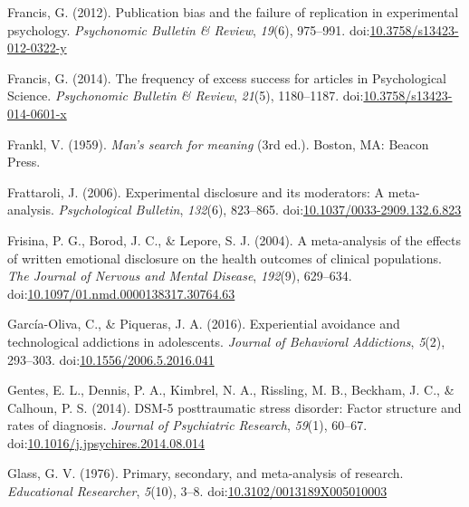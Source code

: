 \documentclass[,man]{apa6}
\begin{document}
\leavevmode\hypertarget{ref-Francis2012}{}%
Francis, G. (2012). Publication bias and the failure of replication in experimental psychology. \emph{Psychonomic Bulletin \& Review}, \emph{19}(6), 975--991. doi:\href{https://doi.org/10.3758/s13423-012-0322-y}{10.3758/s13423-012-0322-y}

\leavevmode\hypertarget{ref-Francis2014}{}%
Francis, G. (2014). The frequency of excess success for articles in Psychological Science. \emph{Psychonomic Bulletin \& Review}, \emph{21}(5), 1180--1187. doi:\href{https://doi.org/10.3758/s13423-014-0601-x}{10.3758/s13423-014-0601-x}

\leavevmode\hypertarget{ref-Frankl1959}{}%
Frankl, V. (1959). \emph{Man's search for meaning} (3rd ed.). Boston, MA: Beacon Press.

\leavevmode\hypertarget{ref-Frattaroli2006}{}%
Frattaroli, J. (2006). Experimental disclosure and its moderators: A meta-analysis. \emph{Psychological Bulletin}, \emph{132}(6), 823--865. doi:\href{https://doi.org/10.1037/0033-2909.132.6.823}{10.1037/0033-2909.132.6.823}

\leavevmode\hypertarget{ref-Frisina2004a}{}%
Frisina, P. G., Borod, J. C., \& Lepore, S. J. (2004). A meta-analysis of the effects of written emotional disclosure on the health outcomes of clinical populations. \emph{The Journal of Nervous and Mental Disease}, \emph{192}(9), 629--634. doi:\href{https://doi.org/10.1097/01.nmd.0000138317.30764.63}{10.1097/01.nmd.0000138317.30764.63}

\leavevmode\hypertarget{ref-Garcia-Oliva2016}{}%
García-Oliva, C., \& Piqueras, J. A. (2016). Experiential avoidance and technological addictions in adolescents. \emph{Journal of Behavioral Addictions}, \emph{5}(2), 293--303. doi:\href{https://doi.org/10.1556/2006.5.2016.041}{10.1556/2006.5.2016.041}

\leavevmode\hypertarget{ref-Gentes2014}{}%
Gentes, E. L., Dennis, P. A., Kimbrel, N. A., Rissling, M. B., Beckham, J. C., \& Calhoun, P. S. (2014). DSM-5 posttraumatic stress disorder: Factor structure and rates of diagnosis. \emph{Journal of Psychiatric Research}, \emph{59}(1), 60--67. doi:\href{https://doi.org/10.1016/j.jpsychires.2014.08.014}{10.1016/j.jpsychires.2014.08.014}

\leavevmode\hypertarget{ref-Glass1976}{}%
Glass, G. V. (1976). Primary, secondary, and meta-analysis of research. \emph{Educational Researcher}, \emph{5}(10), 3--8. doi:\href{https://doi.org/10.3102/0013189X005010003}{10.3102/0013189X005010003}
\end{document}
